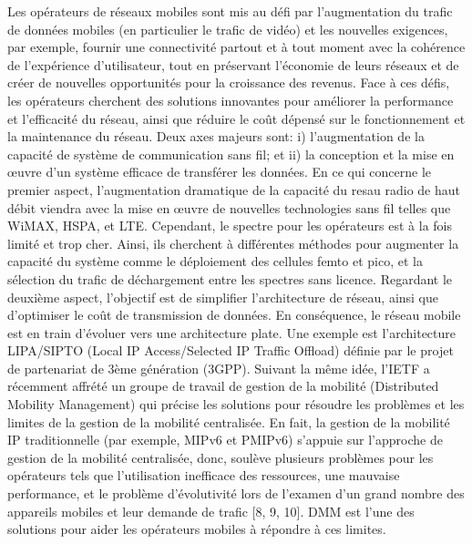 Les opérateurs de réseaux mobiles sont mis au défi par l'augmentation du trafic de données mobiles (en particulier le trafic de vidéo) et les nouvelles exigences, par exemple, fournir une connectivité partout et à tout moment avec la cohérence de l'expérience d'utilisateur, tout en préservant l'économie de leurs réseaux et de créer de nouvelles opportunités pour la croissance des revenus. Face à ces défis, les opérateurs cherchent des solutions innovantes pour améliorer la performance et l'efficacité du réseau, ainsi que réduire le coût dépensé sur le fonctionnement et la maintenance du réseau. Deux axes majeurs sont: i) l'augmentation de la capacité de système de communication sans fil; et ii) la conception et la mise en œuvre d'un système efficace de transférer les données. En ce qui concerne le premier aspect, l'augmentation dramatique de la capacité du resau radio de haut débit viendra avec la mise en œuvre de nouvelles technologies sans fil telles que WiMAX, HSPA, et LTE. Cependant, le spectre pour les opérateurs est à la fois limité et trop cher. Ainsi, ils cherchent à différentes méthodes pour augmenter la capacité du système comme le déploiement des cellules femto et pico, et la sélection du trafic de déchargement entre les spectres sans licence. Regardant le deuxième aspect, l'objectif est de simplifier l'architecture de réseau, ainsi que d'optimiser le coût de transmission de données. En conséquence, le réseau mobile est en train d'évoluer vers une architecture plate. Une exemple est l'architecture LIPA/SIPTO (Local IP Access/Selected IP Traffic Offload) définie par le projet de partenariat de 3ème génération (3GPP). Suivant la même idée, l'IETF a récemment affrété un groupe de travail de gestion de la mobilité (Distributed Mobility Management) qui précise les solutions pour résoudre les problèmes et les limites de la gestion de la mobilité centralisée. En fait, la gestion de la mobilité IP traditionnelle (par exemple, MIPv6 et PMIPv6) s'appuie sur l'approche de gestion de la mobilité centralisée, donc, soulève plusieurs problèmes pour les opérateurs tels que l'utilisation inefficace des ressources, une mauvaise performance, et le problème d'évolutivité lors de l'examen d'un grand nombre des appareils mobiles et leur demande de trafic [8, 9, 10]. DMM est l'une des solutions pour aider les opérateurs mobiles à répondre à ces limites.


